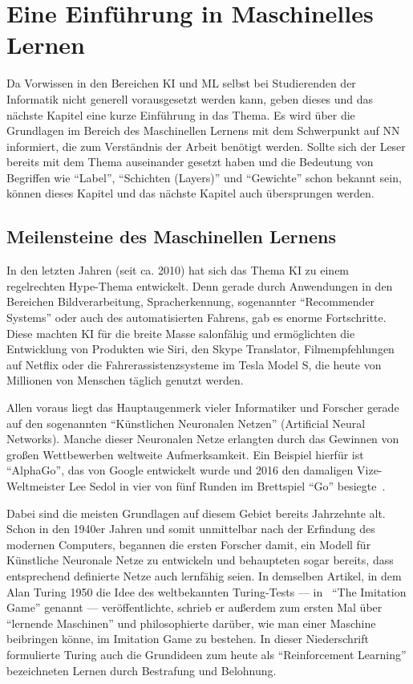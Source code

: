 \chapter{Eine Einführung in Maschinelles Lernen}
Da Vorwissen in den Bereichen \gls{KI} und \gls{ML} selbst bei Studierenden der Informatik nicht generell vorausgesetzt werden kann, geben dieses und das nächste Kapitel eine kurze Einführung in das Thema. Es wird über die Grundlagen im Bereich des Maschinellen Lernens mit dem Schwerpunkt auf \gls{NN} informiert, die zum Verständnis der Arbeit benötigt werden. Sollte sich der Leser bereits mit dem Thema auseinander gesetzt haben und die Bedeutung von Begriffen wie "`\gls{Label}"', "`Schichten (Layers)"' und "`Gewichte"' schon bekannt sein, können dieses Kapitel und das nächste Kapitel auch übersprungen werden.

\section{Meilensteine des Maschinellen Lernens} \label{sec:milestones}
In den letzten Jahren (seit ca. 2010) hat sich das Thema \gls{KI} zu einem regelrechten Hype-Thema entwickelt. Denn gerade durch Anwendungen in den Bereichen Bildverarbeitung, Spracherkennung, sogenannter "`Recommender Systems"' oder auch des automatisierten Fahrens, gab es enorme Fortschritte. Diese machten \gls{KI} für die breite Masse salonfähig und ermöglichten die Entwicklung von Produkten wie Siri, den Skype Translator, Filmempfehlungen auf Netflix oder die Fahrerassistenzsysteme im Tesla Model S, die heute von Millionen von Menschen täglich genutzt werden.

Allen voraus liegt das Hauptaugenmerk vieler Informatiker und Forscher gerade auf den sogenannten "`Künstlichen Neuronalen Netzen"' (Artificial Neural Networks). Manche dieser Neuronalen Netze erlangten durch das Gewinnen von großen Wettbewerben weltweite Aufmerksamkeit. Ein Beispiel hierfür ist "`AlphaGo"', das von Google entwickelt wurde und 2016 den damaligen Vize-Weltmeister Lee Sedol in vier von fünf Runden im Brettspiel "`Go"' besiegte~\cite{alphaGo}.

Dabei sind die meisten Grundlagen auf diesem Gebiet bereits Jahrzehnte alt. Schon in den 1940er Jahren und somit unmittelbar nach der Erfindung des modernen Computers, begannen die ersten Forscher damit, ein Modell für Künstliche Neuronale Netze zu entwickeln und behaupteten sogar bereits, dass entsprechend definierte Netze auch lernfähig seien. In demselben Artikel, in dem Alan Turing 1950 die Idee des weltbekannten Turing-Tests --- in~\cite{TURING.1950} "`The Imitation Game"' genannt --- veröffentlichte, schrieb er außerdem zum ersten Mal über "`lernende Maschinen"' und philosophierte darüber, wie man einer Maschine beibringen könne, im Imitation Game zu bestehen. In dieser Niederschrift formulierte Turing auch die Grundideen zum heute als "`Reinforcement Learning"' bezeichneten Lernen durch Bestrafung und Belohnung.

